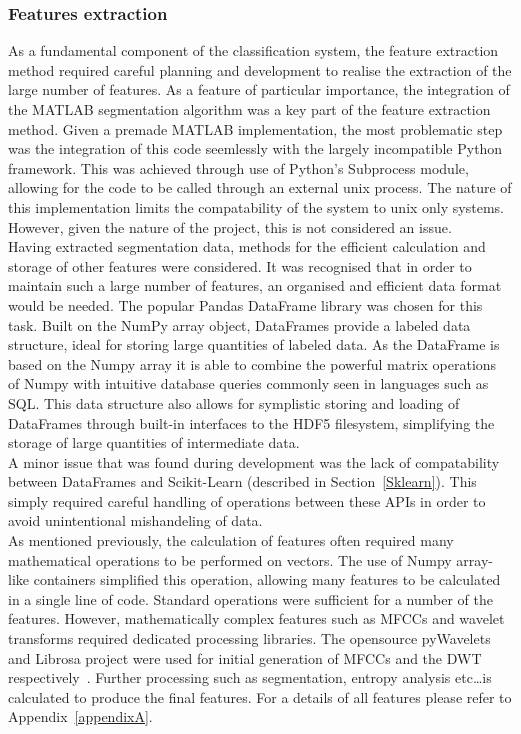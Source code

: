 \documentclass[titlepage, 12pt]{scrartcl} \usepackage{enumitem}
\begin{document}
\subsubsection{Features extraction}
As a fundamental component of the classification system, the feature extraction
method required careful planning and development to realise the extraction of
the large number of features. As a feature of particular importance, the
integration of the MATLAB segmentation algorithm was a key part of the feature
extraction method. Given a premade MATLAB implementation, the most problematic
step was the integration of this code seemlessly with the largely incompatible
Python framework. This was achieved through use of Python's Subprocess module,
allowing for the code to be called through an external unix process. The nature
of this implementation limits the compatability of the system to unix only
systems. However, given the nature of the project, this is not considered an
issue.\\

Having extracted segmentation data, methods for the efficient calculation and
storage of other features were considered. It was recognised that in order to
maintain such a large number of features, an organised and efficient data
format would be needed. The popular Pandas DataFrame library was chosen for
this task. Built on the NumPy array object, DataFrames provide a labeled data
structure, ideal for storing large quantities of labeled data. As the DataFrame
is based on the Numpy array it is able to combine the powerful matrix
operations of Numpy with intuitive database queries commonly seen in languages
such as SQL. This data structure also allows for symplistic storing and loading
of DataFrames through built-in interfaces to the HDF5 filesystem, simplifying
the storage of large quantities of intermediate data.\\
A minor issue that was found during development was the lack of compatability
between DataFrames and Scikit-Learn (described in Section~\ref{Sklearn}). This
simply required careful handling of operations between these APIs in order to
avoid unintentional mishandeling of data.\\

As mentioned previously, the calculation of features often required many
mathematical operations to be performed on vectors. The use of Numpy array-like
containers simplified this operation, allowing many features to be calculated
in a single line of code. Standard operations were sufficient for a number of
the features. However, mathematically complex features such as MFCCs and
wavelet transforms required dedicated processing libraries. The opensource
pyWavelets and Librosa project were used for initial generation of MFCCs and
the DWT respectively~\parencite{pyWave, Mcfee2015}. Further processing such as
segmentation, entropy analysis etc\ldots is calculated to produce the final
features. For a details of all features please refer to
Appendix~\ref{appendixA}.\\
\end{document}
